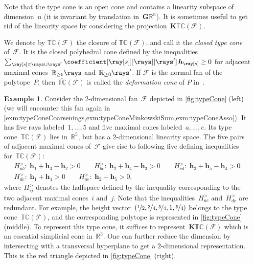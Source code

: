 \documentclass{amsart}
\theoremstyle{definition}
\newtheorem{example}[theorem]{Example}
\newcommand{\R}{\mathbb{R}} %
\renewcommand{\b}[1]{{\boldsymbol{#1}}} %
\newcommand{\darkblue}{\color{darkblue}} %
\newcommand{\defn}[1]{\textsl{\darkblue #1}} %
\newcommand{\Fan}{\mathcal{F}} %
\newcommand{\typeCone}{\mathbb{TC}} %
\newcommand{\ctypeCone}{\overline{\mathbb{TC}}} %
\begin{document}
Note that the type cone is an open cone and contains a linearity subspace of dimension~$n$ (it is invariant by translation in~$\b{G} \R^n$). 
It is sometimes useful to get rid of the linearity space by considering the projection~$\b{K}\typeCone(\Fan)$. 

We denote by $\ctypeCone(\Fan)$ the closure of $\typeCone(\Fan)$, and call it the \defn{closed type cone} of~$\Fan$. It is the closed polyhedral cone defined by the inequalities $\sum_{\ray[s] \in \rays \cup \rays'} \coefficient[{\ray[s]}][\rays][\rays'] \, \b{h}_{\ray[s]} \geq 0$ for adjacent maximal cones~$\R_{\ge0}\rays$ and~$\R_{\ge0}\rays'$. If $\Fan$ is the normal fan of the polytope~$P$, then $\ctypeCone(\Fan)$ is called the \defn{deformation cone} of $P$ in~\cite{Postnikov}.

\begin{example}
\label{exm:typeCone}
\enlargethispage{.5cm}
Consider the $2$-dimensional fan~$\Fan$ depicted in \cref{fig:typeCone} (left) (we will encounter this fan again in \cref{exm:typeConeCoarsenings,exm:typeConeMinkowskiSum,exm:typeConeAsso}).
It has five rays labeled~$1, \dots, 5$ and five maximal cones labeled~$a,\dots, e$.
Its type cone~$\typeCone(\Fan)$ lies in~$\R^5$, but has a $2$-dimensional linearity space.
The five pairs of adjacent maximal cones of~$\Fan$ give rise to following five defining inequalities for~$\typeCone(\Fan)$:
\begin{gather*}
H^>_{ab}: \; \b{h}_1 + \b{h}_3 - \b{h}_2 > 0
\qquad
H^>_{bc}: \; \b{h}_2 + \b{h}_4 - \b{h}_3 > 0
\qquad
H^>_{cd}: \; \b{h}_3 + \b{h}_5 - \b{h}_4 > 0
\\
H^>_{de}: \; \b{h}_1 + \b{h}_4 > 0
\qquad
H^>_{ae}: \; \b{h}_2 + \b{h}_5 > 0,
\end{gather*}
where $H^>_{ij}$ denotes the halfspace defined by the inequality corresponding to the two adjacent maximal cones~$i$ and~$j$.
Note that the inequalities~$H^>_{ae}$ and~$H^>_{de}$ are redundant.
For example, the height vector~$(\nicefrac{1}{2}, \nicefrac{3}{4}, \nicefrac{5}{4}, 1, \nicefrac{5}{4})$ belongs to the type cone~$\typeCone(\Fan)$, and the corresponding polytope is represented in \cref{fig:typeCone} (middle).
To represent this type cone, it suffices to represent~$\b{K}\typeCone(\Fan)$ which is an essential simplicial cone in~$\R^3$.
One can further reduce the dimension by intersecting with a transversal hyperplane to get a $2$-dimensional representation.
This is the red triangle depicted in \cref{fig:typeCone} (right).


\end{example}
\end{document}

